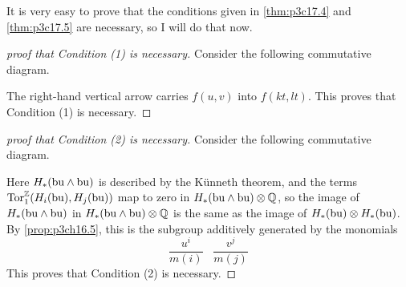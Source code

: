 \documentclass[../main]{subfiles}
\begin{document}
It is very easy to prove that the conditions given in \ref{thm:p3c17.4} and \ref{thm:p3c17.5} are necessary, so I will do that now.
\begin{proof}[proof that Condition (1) is necessary]
Consider the following commutative diagram.


The right-hand vertical arrow carries $f(u,v)$ into $f(kt,lt)$. This proves that Condition (1) is necessary.
\end{proof}
\begin{proof}[proof that Condition (2) is necessary]
Consider the following commutative diagram.


Here $H_*(\mathrm{bu}\wedge\mathrm{bu})$ is described by the K\"unneth theorem, and the terms \newline $\operatorname{\mathrm{Tor}}^{\mathbb{Z}}_1(H_i(\mathrm{bu}),H_j(\mathrm{bu}))$ map to zero in $H_*(\mathrm{bu}\wedge\mathrm{bu})\otimes\mathbb{Q}$, so the image of $H_*(\mathrm{bu}\wedge\mathrm{bu})$ in $H_*(\mathrm{bu}\wedge\mathrm{bu})\otimes\mathbb{Q}$ is the same as the image of $H_*(\mathrm{bu})\otimes H_*(\mathrm{bu})$. By \ref{prop:p3ch16.5}, this is the subgroup additively generated by the monomials
\[
\frac{u^i}{m(i)}\;\;\;\frac{v^j}{m(j)}
\]
This proves that Condition (2) is necessary.
\end{proof}
\end{document}
